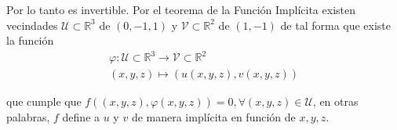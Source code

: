 \documentclass[a4paper,oneside,10.5pt]{article}
\newcommand\RR{\mathbb{R}}
\theoremstyle{definition}
\theoremstyle{plain}
\theoremstyle{remark}
\theoremstyle{theorem}
\begin{document}
Por lo tanto es invertible. Por el teorema de la Función Implícita existen vecindades $\mathcal{U} \subset \RR^3$ de $(0, -1, 1)$ y $\mathcal{V} \subset \RR^2$ de $(1, -1)$ de tal forma que existe la función
\begin{gather*}
    \varphi : \mathcal{U} \subset \RR^3 \to \mathcal{V} \subset \RR^2\\
    (x, y, z) \mapsto (u(x, y, z), v(x, y, z))
\end{gather*}

que cumple que $f((x, y, z), \varphi(x, y, z)) = 0, \forall (x, y, z) \in \mathcal{U}$, en otras palabras, $f$ define a $u$ y $v$ de manera implícita en función de $x, y, z$.
\end{document}
